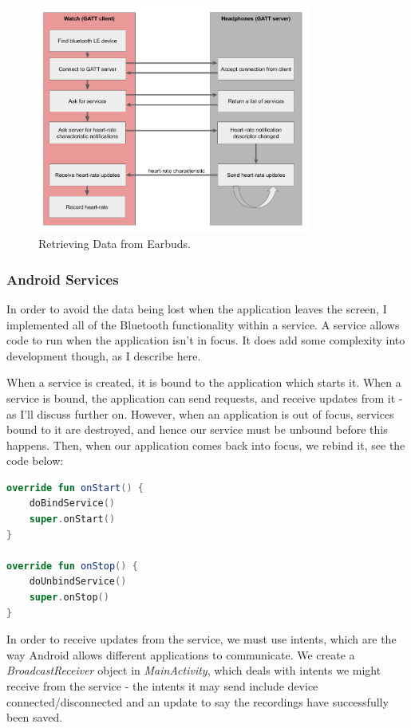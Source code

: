 \documentclass[12pt,a4paper,twoside,openright]{report}
\begin{document}
\begin{figure}[tbh]
	\centerline{\includegraphics[width=0.8\textwidth]{figs/gatt-flow.png}}
	\caption{Retrieving Data from Earbuds.}
	\label{fig:gatt-flow}
\end{figure}

\subsubsection{Android Services}

In order to avoid the data being lost when the application leaves the screen,
I implemented all of the Bluetooth functionality within a service. A service
allows code to run when the application isn't in focus. It does add some
complexity into development though, as I describe here.

When a service is created, it is bound to the application which starts it.
When a service is bound, the application can send requests, and receive
updates from it - as I'll discuss further on. However, when an application is
out of focus, services bound to it are destroyed, and hence our service must
be unbound before this happens. Then, when our application comes back into
focus, we rebind it, see the code below:

\begin{lstlisting}[language=Kotlin]
override fun onStart() {
    doBindService()
    super.onStart()
}

override fun onStop() {
    doUnbindService()
    super.onStop()
}
\end{lstlisting}

In order to receive updates from the service, we must use intents, which are
the way Android allows different applications to communicate. 
We create a \emph{BroadcastReceiver}
object in \emph{MainActivity}, which deals with intents we might receive from
the service - the intents it may send include device connected/disconnected
and an update to say the recordings have successfully been saved. 
\end{document}
